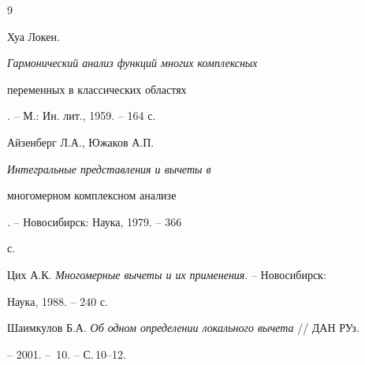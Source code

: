 \begin{thebibliography}{9} 


 




Хуа Локен. {\em Гармонический анализ функций многих комплексных 


переменных в классических областях}. -- М.: Ин. лит., 1959. -- 164 с. 




Айзенберг Л.А., Южаков А.П. {\em Интегральные представления и вычеты в 


многомерном комплексном анализе}. -- Новосибирск: Наука, 1979. -- 366 


с. 




Цих А.К. {\em Многомерные вычеты и их применения}. -- Новосибирск: 


Наука, 1988. -- 240 с. 




Шаимкулов Б.А. {\em Об одном определении локального вычета} // ДАН РУз. 


-- 2001. -- \No\,10. -- С.\,10--12. 


 


\end{thebibliography} 


 


\vskip 2cm 


 






 


\label{end} 


 


